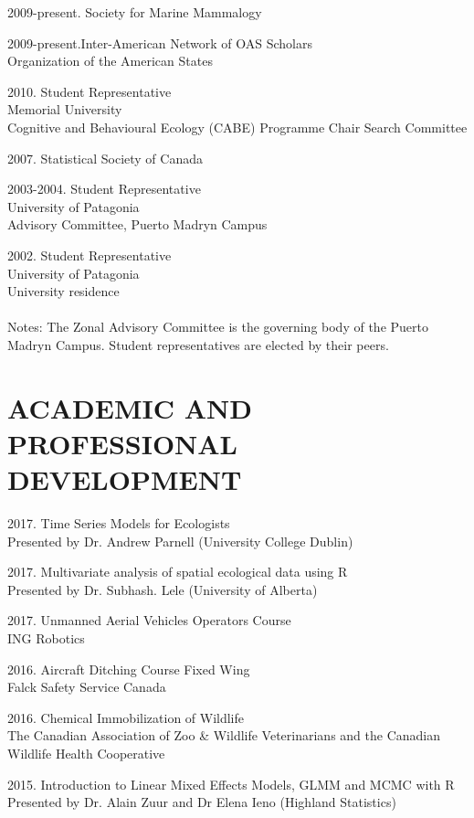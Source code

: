 \documentclass{res}
\begin{document}
\begin{resume}
\begin{hangparas}{.4in}{1}
2009-present. Society for Marine Mammalogy    

2009-present.Inter-American Network of OAS Scholars     \\
Organization of the American States

2010. Student Representative\\
Memorial University\\
Cognitive and Behavioural Ecology (CABE) Programme Chair Search Committee

2007. Statistical Society of Canada

2003-2004. Student Representative\\
University of Patagonia\\
Advisory Committee, Puerto Madryn Campus

2002. Student Representative\\
University of Patagonia\\
University residence\\~\\
Notes: The Zonal Advisory Committee is the governing body of the Puerto Madryn Campus. 
Student representatives are elected by their peers.


\end{hangparas}
\section{ACADEMIC AND PROFESSIONAL DEVELOPMENT}
\vspace{0.2in}
\begin{hangparas}{.4in}{1}
2017. Time Series Models for Ecologists\\ 
Presented by Dr. Andrew Parnell (University College Dublin)

2017. Multivariate analysis of spatial ecological data using R\\
Presented by Dr. Subhash. Lele (University of Alberta)

2017. Unmanned Aerial Vehicles Operators Course\\ 
ING Robotics

2016. Aircraft Ditching Course Fixed Wing \\
Falck Safety Service Canada

2016. Chemical Immobilization of Wildlife\\
The Canadian Association of Zoo \& Wildlife Veterinarians and the Canadian Wildlife Health Cooperative

2015. Introduction to Linear Mixed Effects Models, GLMM and MCMC with R\\
Presented by Dr. Alain Zuur and Dr Elena Ieno (Highland Statistics)


\end{hangparas}
\end{resume}
\end{document}
